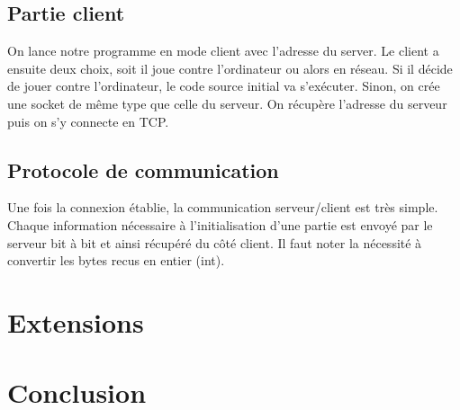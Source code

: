 \documentclass{article}
\begin{document}
	\subsection{Partie client}
	On lance notre programme en mode client avec l'adresse du server.
	Le client a ensuite deux choix, soit il joue contre l'ordinateur ou alors en r\'eseau.
	Si il d\'ecide de jouer contre l'ordinateur, le code source initial va s'ex\'ecuter.
	Sinon, on cr\'ee une socket de m\^eme type que celle du serveur.
	On r\'ecup\`ere l'adresse du serveur puis on s'y connecte en TCP.

	\subsection{Protocole de communication}
	Une fois la connexion \'etablie, la communication serveur/client est tr\`es simple.
	Chaque information n\'ecessaire \`a l'initialisation d'une partie est envoy\'e par le serveur bit \`a bit et ainsi r\'ecup\'er\'e du c\^ot\'e client.
	Il faut noter la n\'ecessit\'e \`a convertir les bytes recus en entier (int).

\section{Extensions}

\section{Conclusion}
\end{document}
